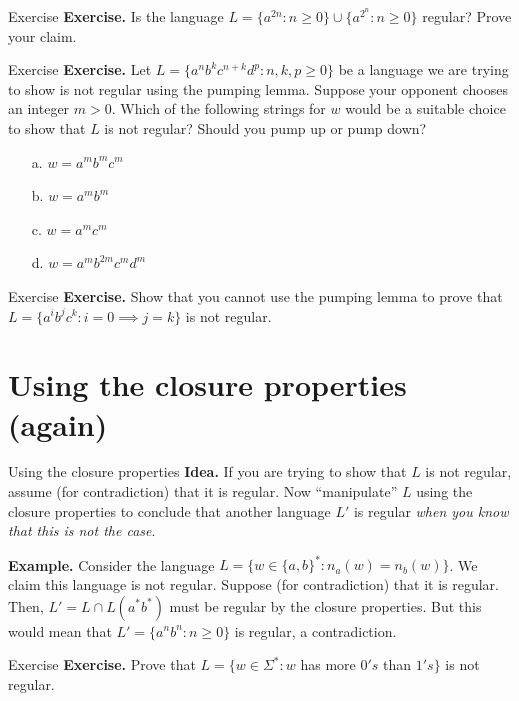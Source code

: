 \documentclass[10pt]{beamer}
\begin{document}
\begin{frame}[t]{Exercise}
    \textbf{Exercise.} Is the language $L = \{a^{2n} : n \geq 0\} \cup \{a^{2^n} : n \geq 0 \}$ regular? Prove your claim.
\end{frame}

\begin{frame}[t]{Exercise}
    \textbf{Exercise.} Let $L = \{a^nb^kc^{n+k}d^p : n,k,p \geq 0\}$ be a language we are trying to show is not regular using the pumping lemma. Suppose your opponent chooses an integer $m > 0$. Which of the following strings for $w$ would be a suitable choice to show that $L$ is not regular? Should you pump up or pump down?
    \begin{itemize}
        \item[a.] $w = a^mb^mc^m$
        \item[b.] $w = a^mb^m$
        \item[c.] $w = a^mc^m$
        \item[d.] $w = a^mb^{2m}c^md^m$
    \end{itemize}
\end{frame}

\begin{frame}[t]{Exercise}
    \textbf{Exercise.} Show that you cannot use the pumping lemma to prove that $L = \{a^ib^jc^k : i = 0 \implies j = k\}$ is not regular.
\end{frame}

\section{Using the closure properties (again)}

\begin{frame}{Using the closure properties}
    \textbf{Idea.} If you are trying to show that $L$ is not regular, assume (for contradiction) that it is regular. Now ``manipulate'' $L$ using the closure properties to conclude that another language $L'$ is regular \textit{when you know that this is not the case}.

    \textbf{Example.} Consider the language $L = \{ w \in \{a, b\}^* : n_a(w) = n_b(w) \}$. We claim this language is not regular. Suppose (for contradiction) that it is regular. Then, $L' = L \cap L(a^*b^*)$ must be regular by the closure properties. But this would mean that $L' = \{a^nb^n : n \geq 0\}$ is regular, a contradiction.
\end{frame}

\begin{frame}[t]{Exercise}
    \textbf{Exercise.} Prove that $L=\{w\in \Sigma ^*: w$ has more $0's$ than $1's \}$ is not regular.
\end{frame}
\end{document}
